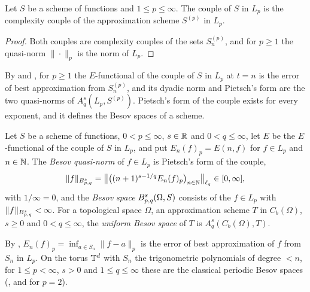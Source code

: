 \begin{lemma}
\label{lem:scheme-lp-couple-bridge}
\leanok
{}
Let $S$ be a scheme of functions and $1 \leq p \leq \infty$. The couple of $S$ in $L_p$ is the
complexity couple of the approximation scheme $S^{(p)}$ in $L_p$.
\end{lemma}

\begin{proof}
\leanok
Both couples are complexity couples of the sets $S^{(p)}_n$, and for $p \geq 1$ the quasi-norm
$\|\cdot\|_p$ is the norm of $L_p$.
\end{proof}

By  and , for $p \geq 1$ the
$E$-functional of the couple of $S$ in $L_p$ at $t = n$ is the error of best approximation from
$S^{(p)}_n$, and its dyadic norm and Pietsch's form are the two quasi-norms of
$A^s_q(L_p, S^{(p)})$. Pietsch's form of the couple exists for every exponent, and it defines the
Besov spaces of a scheme.

\begin{definition}
\label{def:besov}
\leanok
{}
Let $S$ be a scheme of functions, $0 < p \leq \infty$, $s \in \mathbb{R}$ and $0 < q \leq \infty$, let
$E$ be the $E$-functional of the couple of $S$ in $L_p$, and put $E_n(f)_p = E(n, f)$ for
$f \in L_p$ and $n \in \mathbb{N}$. The \emph{Besov quasi-norm} of $f \in L_p$ is Pietsch's form of the
couple,
\[
  \|f\|_{B^{s}_{p,q}} = \bigl\| \bigl((n+1)^{s - 1/q} E_n(f)_p\bigr)_{n \in \mathbb{N}}
  \bigr\|_{\ell_q} \in [0, \infty] ,
\]
with $1/\infty = 0$, and the \emph{Besov space} $B^{s}_{p,q}(\Omega, S)$ consists of the
$f \in L_p$ with $\|f\|_{B^{s}_{p,q}} < \infty$. For a topological space $\Omega$, an
approximation scheme $T$ in $C_b(\Omega)$, $s \geq 0$ and $0 < q \leq \infty$, the
\emph{uniform Besov space} of $T$ is $A^s_q(C_b(\Omega), T)$.
\end{definition}

By , $E_n(f)_p = \inf_{a \in S_n} \|f - a\|_p$ is the error of best
approximation of $f$ from $S_n$ in $L_p$. On the torus $\mathbb{T}^d$ with $S_n$ the trigonometric
polynomials of degree $< n$, for $1 \leq p < \infty$, $s > 0$ and $1 \leq q \leq \infty$ these
are the classical periodic Besov spaces (, and
 for $p = 2$).

